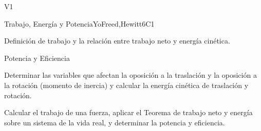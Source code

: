 \begin{syllabus}
\begin{specificoutcomes}{V1}
   \item {}
   \item {}
   \item {}
   \item {}
   \item {}
   \item {}
   \item {}
   \item {}
   \item {}
   \item {}
   \item {}
   \item {}
   \item {}
   \item {}
   \item {}
\end{specificoutcomes}

\begin{unit}{Trabajo, Energía y Potencia}{}{YoFreed,Hewitt}{6}{C1}
   \begin{topics}
      \item Definición de trabajo y la relación entre trabajo neto y energía cinética.
      \item Potencia y Eficiencia
   \end{topics}

   \begin{learningoutcomes}
      \item Determinar las variables que afectan la oposición a la traslación y la oposición a la rotación (momento de inercia) y calcular la energía cinética de traslación y rotación.
      \item Calcular el trabajo de una fuerza, aplicar el Teorema de trabajo neto y energía sobre un sistema de la vida real, y determinar la potencia y eficiencia.
   \end{learningoutcomes}
\end{unit}


\end{syllabus}
